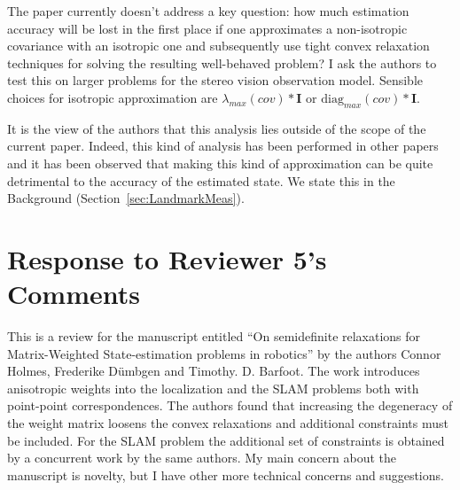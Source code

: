 The paper currently doesn't address a key question: how much estimation accuracy will be lost in the first place if one approximates a non-isotropic covariance with an isotropic one and subsequently use tight convex relaxation techniques for solving the resulting well-behaved problem? I ask the authors to test this on larger problems for the stereo vision observation model. Sensible choices for isotropic approximation are $\lambda_{max}(cov) * \bm{I}$ or $\mbox{diag}_{max}(cov) * \bm{I}$. 
\begin{response}
It is the view of the authors that this analysis lies outside of the scope of the current paper. Indeed, this kind of analysis has been performed in other papers and it has been observed that making this kind of approximation can be quite detrimental to the accuracy of the estimated state. We state this in the Background (Section~\ref{sec:LandmarkMeas}).

\end{response}

\section*{Response to Reviewer 5's Comments}

This is a review for the manuscript entitled ``On semidefinite relaxations for Matrix-Weighted State-estimation problems in robotics'' by the authors Connor Holmes, Frederike Dümbgen and Timothy. D. Barfoot. The work introduces anisotropic weights into the localization and the SLAM problems both with point-point correspondences. The authors found that increasing the degeneracy of the weight matrix loosens the convex relaxations and additional constraints must be included. For the SLAM problem the additional set of constraints is obtained by a concurrent work by the same authors.  My main concern about the manuscript is novelty, but I have other more technical concerns and suggestions.

